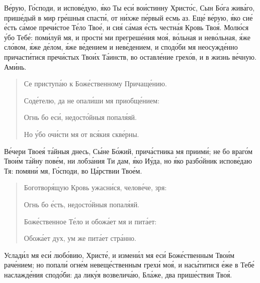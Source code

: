 \begin{mymulticols}
В\'{е}рую, Г\'{о}споди, и испов\'{е}дую, \'{я}ко Ты ес\'{и} во\'{и}стинну Христ\'{о}с, Сын Б\'{о}га жив\'{а}го, приш\'{е}дый в мир гр\'{е}шныя спаст\'{и}, от н\'{и}хже п\'{е}рвый есмь аз. Ещ\'{е} в\'{е}рую, \'{я}ко си\'{е} \'{е}сть с\'{а}мое преч\'{и}стое Т\'{е}ло Тво\'{е}, и си\'{я} с\'{а}мая \'{е}сть честн\'{а}я Кровь Тво\'{я}. Мол\'{ю}ся \'{у}бо Теб\'{е}: пом\'{и}луй мя, и прост\'{и} ми прегреш\'{е}ния мо\'{я}, в\'{о}льная и нев\'{о}льная, \'{я}же сл\'{о}вом, \'{я}же д\'{е}лом, \'{я}же в\'{е}дением и нев\'{е}дением, и спод\'{о}би мя неосужд\'{е}нно причаст\'{и}тися преч\'{и}стых Тво\'{и}х Т\'{а}инств, во оставл\'{е}ние грех\'{о}в, и в жизнь в\'{е}чную. Ам\'{и}нь.


\begin{verse}

{\small Се приступ\'{а}ю к Бож\'{е}ственному Причащ\'{е}нию.

Сод\'{е}телю, да не опал\'{и}ши мя приобщ\'{е}нием:

Огнь бо ес\'{и}, недост\'{о}йныя попал\'{я}яй.

Но \'{у}бо оч\'{и}сти мя от вс\'{я}кия скв\'{е}рны.}

\end{verse}


В\'{е}чери Твое\'{я} т\'{а}йныя днесь, С\'{ы}не Б\'{о}жий, прич\'{а}стника мя приим\'{и}; не бо враг\'{о}м Тво\'{и}м т\'{а}йну пов\'{е}м, ни лобз\'{а}ния Ти дам, \'{я}ко И\'{у}да, но \'{я}ко разб\'{о}йник испов\'{е}даю Тя: помян\'{и} мя, Г\'{о}споди, во Ц\'{а}рствии Тво\'{е}м.


\begin{verse}

{\small Боготвор\'{я}щую Кровь ужасн\'{и}ся, челов\'{е}че, зря:

Огнь бо \'{е}сть, недост\'{о}йныя попал\'{я}яй.

Бож\'{е}ственное Т\'{е}ло и обож\'{а}ет мя и пит\'{а}ет:

Обож\'{а}ет дух, ум же пит\'{а}ет стр\'{а}нно.}

\end{verse}


Услад\'{и}л мя ес\'{и} люб\'{о}вию, Христ\'{е}, и измен\'{и}л мя ес\'{и} Бож\'{е}ственным Тво\'{и}м рач\'{е}нием; но попал\'{и} огн\'{е}м невещ\'{е}ственным грех\'{и} мо\'{я}, и нас\'{ы}титися \'{е}же в Теб\'{е} наслажд\'{е}ния спод\'{о}би: да лик\'{у}я возвелич\'{а}ю, Бл\'{а}же, два приш\'{е}ствия Тво\'{я}.


\end{mymulticols}
